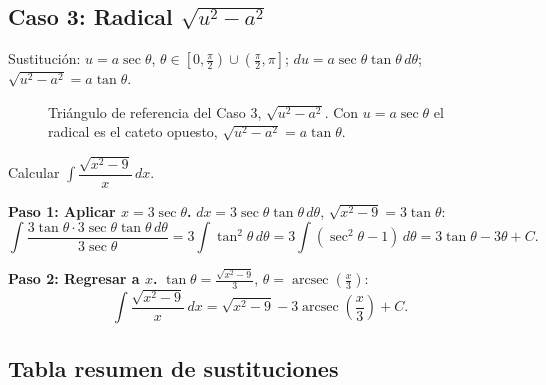 \subsection{Caso 3: Radical $\sqrt{u^2-a^2}$}

Sustitución: $u=a\sec\theta$, $\theta\in\left[0,\frac{\pi}{2}\right)\cup
\left(\frac{\pi}{2},\pi\right]$; $du=a\sec\theta\tan\theta\,d\theta$;
$\sqrt{u^2-a^2}=a\tan\theta$.

\begin{figure}[!htbp]
\centering
{}
\caption{Triángulo de referencia del Caso 3, $\sqrt{u^2-a^2}$. Con $u=a\sec\theta$ el radical es el cateto opuesto, $\sqrt{u^2-a^2}=a\tan\theta$.}
\label{fig:triangulo_caso3}
\end{figure}

\begin{example}
Calcular $\displaystyle\int\dfrac{\sqrt{x^2-9}}{x}\,dx$.

\begin{myproof}

\textbf{Paso 1: Aplicar $x=3\sec\theta$.}
$dx=3\sec\theta\tan\theta\,d\theta$, $\sqrt{x^2-9}=3\tan\theta$:
\[
\int\frac{3\tan\theta\cdot 3\sec\theta\tan\theta\,d\theta}{3\sec\theta}
=3\int\tan^2\!\theta\,d\theta
=3\int(\sec^2\theta-1)\,d\theta
=3\tan\theta-3\theta+C.
\]

\textbf{Paso 2: Regresar a $x$.}
$\tan\theta=\frac{\sqrt{x^2-9}}{3}$, $\theta=\operatorname{arcsec}\!\!\left(\frac{x}{3}\right)$:
\[
\boxed{\int\frac{\sqrt{x^2-9}}{x}\,dx
=\sqrt{x^2-9}-3\operatorname{arcsec}\!\!\left(\frac{x}{3}\right)+C.}
\]
\end{myproof}
\end{example}

\subsection{Tabla resumen de sustituciones}


